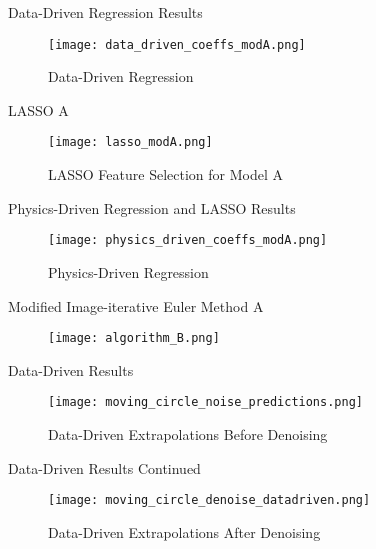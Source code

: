 \documentclass[aspectratio=169,xcolor=dvipsnames]{beamer}
\begin{document}
\begin{frame}{Data-Driven Regression Results}
    \begin{figure}
        \centering
        \texttt{[image: data\_driven\_coeffs\_modA.png]}
        \caption{Data-Driven Regression}
        \label{fig:data_driven_regA}
    \end{figure}
\end{frame}

\begin{frame}{LASSO A}
    \begin{figure}
        \centering
        \texttt{[image: lasso\_modA.png]}
        \caption{LASSO Feature Selection for Model A}
        \label{fig:lasso_B}
    \end{figure}
\end{frame}

\begin{frame}{Physics-Driven Regression and LASSO Results}
\begin{figure}
    \centering
        \texttt{[image: physics\_driven\_coeffs\_modA.png]}
        \caption{Physics-Driven Regression}
        \label{fig:physics_driven_regA}
        \end{figure}
\end{frame}

\begin{frame} {Modified Image-iterative Euler Method A}
\begin{figure}
    \centering
    \texttt{[image: algorithm\_B.png]}
\end{figure}
\end{frame}

\begin{frame}{Data-Driven Results}
    \begin{figure}
        \centering
        \texttt{[image: moving\_circle\_noise\_predictions.png]}
        \caption{Data-Driven Extrapolations Before Denoising}
    \end{figure}
\end{frame}

\begin{frame}{Data-Driven Results Continued}
    \begin{figure}
        \centering
        \texttt{[image: moving\_circle\_denoise\_datadriven.png]}
        \caption{Data-Driven Extrapolations After Denoising}
    \end{figure}
\end{frame}
\end{document}
